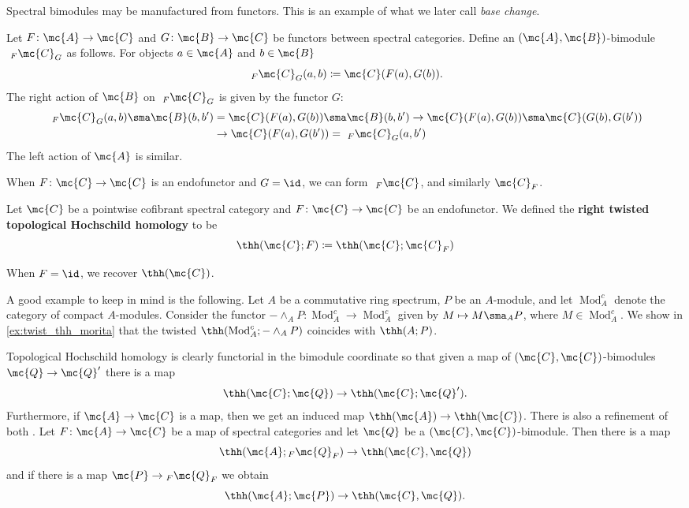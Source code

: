 \documentclass[11pt]{amsart}
\begin{document}
Spectral bimodules may be manufactured from functors. This is an example of what we later call \textit{base change}. 

\begin{defn}\label{def:base_change}
  Let $F\colon  \mc{A} \to \mc{C}$ and  $G\colon  \mc{B} \to \mc{C}$ be functors between spectral categories. Define an $(\mc{A}, \mc{B})$-bimodule $ \ _F \mc{C}_G$ as follows. For objects $a\in \mc{A}$ and $b \in \mc{B}$
  \[
  \ _F \mc{C}_G (a, b) \coloneqq \mc{C}(F(a), G(b)).  
  \]
 The right action of $\mc{B}$ on $\ _F \mc{C}_G$ is given by the functor $G$:
  \begin{align*}
  \ _F \mc{C}_G(a, b) \sma \mc{B} (b, b') &= \mc{C}(F(a),G(b)) \sma \mc{B} (b, b') \to \mc{C}(F(a), G(b)) \sma \mc{C}(G(b), G(b'))\\ &\to \mc{C} (F(a), G(b')) = \ _F \mc{C}_G (a, b') 
  \end{align*}  The left action of $\mc{A}$ is similar.
\end{defn}

\begin{example}
	When $F\colon  \mc{C} \to \mc{C}$ is an endofunctor and $G = \id$, we can form $\ _F \mc{C}$, and similarly $\mc{C}_F$. 
\end{example}

\begin{defn}\label{right_twisted}
  Let $\mc{C}$ be a pointwise cofibrant spectral category and $F\colon  \mc{C} \to \mc{C}$ be an endofunctor. We defined the \textbf{right twisted topological Hochschild homology} to be
  \[
  \thh(\mc{C}; F)\coloneqq\thh(\mc{C}; \mc{C}_F) 
  \]
\end{defn}

\begin{rmk}
When $F = \id$, we recover $\thh(\mc{C})$. 
\end{rmk}

\begin{example}\label{eg:twisted_thh}
A good example to keep in mind is the following. Let $A$ be a commutative ring spectrum,  $P$ be an $A$-module, and let $\operatorname{Mod}^c_A$ denote the category of compact $A$-modules. Consider the functor $-\wedge_AP \colon  \operatorname{Mod}^c_A \to \operatorname{Mod}^c_A$ given by $M \mapsto M \sma_A P$, where $M \in \operatorname{Mod}^c_A$. We show  in \cref{ex:twist_thh_morita} that the twisted $\thh(\operatorname{Mod}^c_A; -\wedge _AP)$ coincides with $\thh(A; P)$.
\end{example}


Topological Hochschild homology is clearly functorial in the bimodule coordinate so that given a map of $(\mc{C}, \mc{C})$-bimodules $\mc{Q} \to \mc{Q}'$  there is a map
\[
\thh(\mc{C}; \mc{Q}) \to \thh(\mc{C}; \mc{Q}').  
\]
Furthermore, if $\mc{A} \to \mc{C}$ is a map, then we get an induced map $\thh(\mc{A}) \to \thh(\mc{C})$. There is also a refinement of both \cite{blumberg_mandell}. Let $F\colon  \mc{A} \to \mc{C}$ be a map of spectral categories and let $\mc{Q}$ be a $(\mc{C},\mc{C})$-bimodule. Then there is a map
\[
\thh(\mc{A};{_F\mc{Q}_F}) \to \thh(\mc{C}, \mc{Q}) 
\]
and if there is a map $\mc{P} \to {_F \mc{Q}_F}$ we obtain
\[
\thh(\mc{A}; \mc{P}) \to \thh (\mc{C}, \mc{Q}). 
\]
\end{document}
